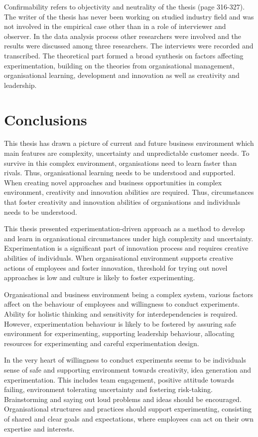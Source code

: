 Confirmability refers to objectivity and neutrality of the thesis \citep{lincoln1985naturalistic} (page 316-327). The writer of the thesis has never been working on studied industry field and was not involved in the empirical case other than in a role of interviewer and observer. In the data analysis process other researchers were involved and the results were discussed among three researchers. The interviews were recorded and transcribed. The theoretical part formed a broad synthesis on factors affecting experimentation, building on the theories from organisational management, organisational learning, development and innovation as well as creativity and leadership. 

\chapter{Conclusions}
This thesis has drawn a picture of current and future business environment which main features are complexity, uncertainty and unpredictable customer needs. To survive in this complex environment, organisations need to learn faster than rivals. Thus, organisational learning needs to be understood and supported. When creating novel approaches and business opportunities in complex environment, creativity and innovation abilities are required. Thus, circumstances that foster creativity and innovation abilities of organisations and individuals needs to be understood. 

This thesis presented experimentation-driven approach as a method to develop and learn in organisational circumstances under high complexity and uncertainty. Experimentation is a significant part of innovation process and requires creative abilities of individuals. When organisational environment supports creative actions of employees and foster innovation, threshold for trying out novel approaches is low and culture is likely to foster experimenting. 

Organisational and business environment being a complex system, various factors affect on the behaviour of employees and willingness to conduct experiments. Ability for holistic thinking and sensitivity for interdependencies is required. However, experimentation behaviour is likely to be fostered by assuring safe environment for experimenting, supporting leadership behaviour, allocating resources for experimenting and careful experimentation design. 

In the very heart of willingness to conduct experiments seems to be individuals sense of safe and supporting environment towards creativity, idea generation and experimentation. This includes team engagement, positive attitude towards failing, environment tolerating uncertainty and fostering risk-taking. Brainstorming and saying out loud problems and ideas should be encouraged. 
Organisational structures and practices should support experimenting, consisting of shared and clear goals and expectations, where employees can act on their own expertise and interests.


